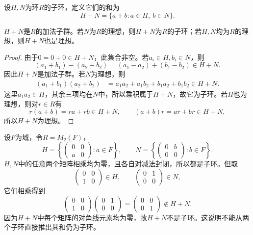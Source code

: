 \begin{definition}
设$H,N$为环$R$的子环，定义它们的和为
\[
H+N=\{a+b:a\in H,\ b\in N\}.
\]
\end{definition}
\begin{proposition}
	$H+N $是$R$的加法子群。若$N$为$R$的理想，则$H+N$为$R$的子环；若$H,N$均为$R$的理想，则$H+N$也是理想。
\end{proposition}
\begin{proof}
	由于$0=0+0\in H+N$，此集合非空。若$a_i\in H,b_i\in N$，则
\[
(a_1+b_1)-(a_2+b_2)=(a_1-a_2)+(b_1-b_2)\in H+N.
\]
因此$H+N$是加法子群。若$N$为理想，则
	\begin{align*}
		(a_1+b_1)(a_2+b_2)
		&=a_1a_2+a_1b_2+b_1a_2+b_1b_2\in H+N.
	\end{align*}
	这里$a_1a_2\in H$，其余三项均在$N$中，所以乘积属于$H+N$，故它为子环。若$H$也为理想，则对$r\in R$有
	\[
	r(a+b)=ra+rb\in H+N,\qquad (a+b)r=ar+br\in H+N,
	\]
	所以$H+N$为理想。
\end{proof}
\begin{example}
设$F$为域，令$R=M_2(F)$，
\[
H=\left\{\begin{pmatrix}0&0\\a&0\end{pmatrix}:a\in F\right\},\qquad
N=\left\{\begin{pmatrix}0&b\\0&0\end{pmatrix}:b\in F\right\}.
\]
$H,N$中的任意两个矩阵相乘均为零，且各自对减法封闭，所以都是子环。但取
\[
\begin{pmatrix}0&0\\1&0\end{pmatrix}\in H,\qquad
\begin{pmatrix}0&1\\0&0\end{pmatrix}\in N,
\]
它们相乘得到
\[
\begin{pmatrix}0&0\\1&0\end{pmatrix}
\begin{pmatrix}0&1\\0&0\end{pmatrix}
=\begin{pmatrix}0&0\\0&1\end{pmatrix}\notin H+N.
\]
因为$H+N$中每个矩阵的对角线元素均为零，故$H+N$不是子环。这说明不能从两个子环直接推出其和仍为子环。
\end{example}

